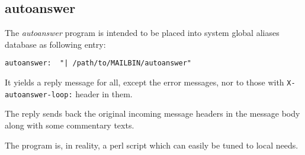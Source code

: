 \subsection{autoanswer}



The {\em autoanswer\/} program is intended to be placed into
system global aliases database as following entry:

\begin{verbatim}
autoanswer:  "| /path/to/MAILBIN/autoanswer"
\end{verbatim}


It yields a reply message for all, except the error messages, nor
to those with {\tt X-autoanswer-loop:} header in them.

The reply sends back the original incoming message headers in the
message body along with some commentary texts.

The program is, in reality, a perl script which can easily be tuned
to local needs.

